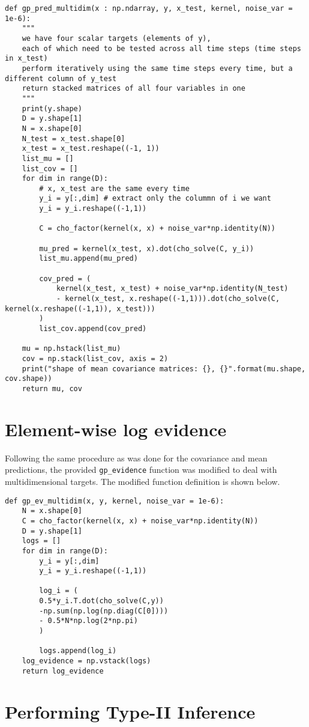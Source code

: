 \documentclass{article}
\begin{document}
\begin{verbatim}
def gp_pred_multidim(x : np.ndarray, y, x_test, kernel, noise_var = 1e-6):
    """
    we have four scalar targets (elements of y),
    each of which need to be tested across all time steps (time steps in x_test)
    perform iteratively using the same time steps every time, but a different column of y_test
    return stacked matrices of all four variables in one
    """
    print(y.shape)
    D = y.shape[1]
    N = x.shape[0]
    N_test = x_test.shape[0]
    x_test = x_test.reshape((-1, 1))
    list_mu = []
    list_cov = []
    for dim in range(D):
        # x, x_test are the same every time
        y_i = y[:,dim] # extract only the colummn of i we want
        y_i = y_i.reshape((-1,1))
        
        C = cho_factor(kernel(x, x) + noise_var*np.identity(N))
        
        mu_pred = kernel(x_test, x).dot(cho_solve(C, y_i))
        list_mu.append(mu_pred)
        
        cov_pred = (
            kernel(x_test, x_test) + noise_var*np.identity(N_test)
            - kernel(x_test, x.reshape((-1,1))).dot(cho_solve(C, kernel(x.reshape((-1,1)), x_test)))
        )
        list_cov.append(cov_pred)
    
    mu = np.hstack(list_mu)
    cov = np.stack(list_cov, axis = 2)
    print("shape of mean covariance matrices: {}, {}".format(mu.shape, cov.shape))
    return mu, cov
\end{verbatim}


\section{Element-wise log evidence}
Following the same procedure as was done for the covariance and mean predictions, the provided \verb+gp_evidence+ function was modified to deal with multidimensional targets. The modified function definition is shown below.

\begin{verbatim}
def gp_ev_multidim(x, y, kernel, noise_var = 1e-6):
    N = x.shape[0]
    C = cho_factor(kernel(x, x) + noise_var*np.identity(N))    
    D = y.shape[1]
    logs = []
    for dim in range(D):
        y_i = y[:,dim]
        y_i = y_i.reshape((-1,1))
        
        log_i = (
        0.5*y_i.T.dot(cho_solve(C,y))
        -np.sum(np.log(np.diag(C[0])))
        - 0.5*N*np.log(2*np.pi)
        )
        
        logs.append(log_i)
    log_evidence = np.vstack(logs)
    return log_evidence
\end{verbatim}

\section{Performing Type-II Inference}
\end{document}
